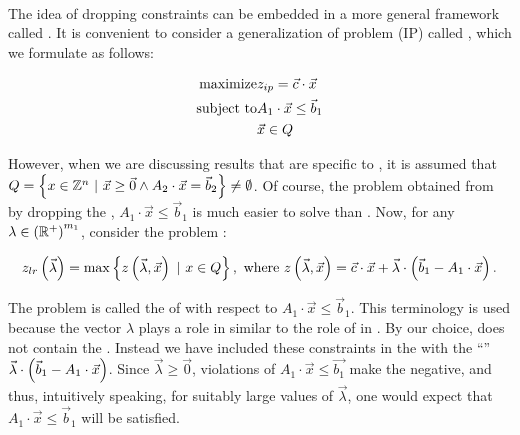 \paragraph{}
The idea of dropping constraints can be embedded in a more general framework called . It is convenient to consider a generalization of problem (IP) called , which we formulate as follows:

\begin{eqnarray}
\mbox{maximize}&z_{ip}=\vec{c}\cdot\vec{x}\eqnlab{lagrageb-m}\\
\mbox{subject to}&A_1\cdot\vec{x}\leq\vec{b}_1\eqnlab{lagrageb-c1}\\
&\vec{x}\in Q\eqnlab{lagrageb-c2}
\end{eqnarray}

However, when we are discussing results that are specific to , it is assumed that $Q=\left\{ x\in\mathbb{Z}^n\ |\ \vec{x}\geq\vec{0}\wedge A_2\cdot\vec{x}=\vec{b}_2 \right\}\neq\emptyset$. Of course, the problem obtained from  by dropping the , $A_1\cdot\vec{x}\leq\vec{b}_1$ is much easier to solve than . Now, for any $\lambda\in\left( \mathbb{R}^+ \right)^{m_1}$, consider the problem :

\begin{equation}
z_{lr}\left( \vec{\lambda} \right)=\max\left\{ z\left( \vec{\lambda},\vec{x} \right)\ |\ x\in Q \right\},\mbox{ where }z\left( \vec{\lambda},\vec{x} \right)=\vec{c}\cdot\vec{x}+\vec{\lambda}\cdot\left( \vec{b}_1-A_1\cdot\vec{x} \right).
\end{equation}

The problem  is called the  of  with respect to $A_1\cdot\vec{x}\leq\vec{b}_1$. This terminology is used because the vector $\lambda$ plays a role in  similar to the role of  in . By our choice,  does not contain the . Instead we have included these constraints in the  with the ``'' $\vec{\lambda}\cdot\left( \vec{b}_1-A_1\cdot\vec{x} \right)$. Since $\vec{\lambda}\geq\vec{0}$, violations of $A_1\cdot\vec{x}\leq\vec{b_1}$ make the  negative, and thus, intuitively speaking, for suitably large values of $\vec{\lambda}$, one would expect that $A_1\cdot\vec{x}\leq\vec{b}_1$ will be satisfied.

